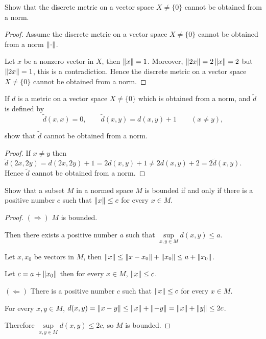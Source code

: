 \begin{exercise}\label{chapter2:section2:exercise13}
    Show that the discrete metric on a vector space $X\ne \{0\}$ cannot be obtained from a norm.
\end{exercise}

\begin{proof}
    Assume the discrete metric on a vector space $X\ne \{0\}$ cannot be obtained from a norm $\left\Vert{\cdot}\right\Vert$.

    Let $x$ be a nonzero vector in $X$, then $\left\Vert{x}\right\Vert = 1$. Moreover, $\left\Vert{2x}\right\Vert = 2\left\Vert{x}\right\Vert = 2$ but $\left\Vert{2x}\right\Vert = 1$, this is a contradiction. Hence the discrete metric on a vector space $X\ne \{0\}$ cannot be obtained from a norm.
\end{proof}

\begin{exercise}\label{chapter2:section2:exercise14}
    If $d$ is a metric on a vector space $X \ne \{0\}$ which is obtained from a norm, and $\tilde{d}$ is defined by
    \[
        \tilde{d}(x, x) = 0, \qquad \tilde{d}(x, y) = d(x, y) + 1 \qquad (x\ne y),
    \]

    show that $\tilde{d}$ cannot be obtained from a norm.
\end{exercise}

\begin{proof}
    If $x\ne y$ then $\tilde{d}(2x, 2y) = d(2x, 2y) + 1 = 2d(x, y) + 1\ne 2d(x, y) + 2 = 2\tilde{d}(x, y)$. Hence $\tilde{d}$ cannot be obtained from a norm.
\end{proof}

\begin{exercise}\label{chapter2:section2:exercise15}
    Show that a subset $M$ in a normed space $M$ is bounded if and only if there is a positive number $c$ such that $\left\Vert{x}\right\Vert\leq c$ for every $x\in M$.
\end{exercise}

\begin{proof}
    $(\Rightarrow)$ $M$ is bounded.

    Then there exists a positive number $a$ such that $\sup\limits_{x, y\in M}d(x, y)\leq a$.

    Let $x, x_{0}$ be vectors in $M$, then $\left\Vert{x}\right\Vert \leq \left\Vert{x - x_{0}}\right\Vert + \left\Vert{x_{0}}\right\Vert \leq a + \left\Vert{x_{0}}\right\Vert$.

    Let $c = a + \left\Vert{x_{0}}\right\Vert$ then for every $x\in M$, $\left\Vert{x}\right\Vert\leq c$.

    $(\Leftarrow)$ There is a positive number $c$ such that $\left\Vert{x}\right\Vert\leq c$ for every $x\in M$.

    For every $x, y\in M$, $d(x, y) = \left\Vert{x - y}\right\Vert\leq \left\Vert{x}\right\Vert + \left\Vert{-y}\right\Vert = \left\Vert{x}\right\Vert + \left\Vert{y}\right\Vert \leq 2c$.

    Therefore $\sup\limits_{x,y\in M}d(x, y)\leq 2c$, so $M$ is bounded.
\end{proof}

